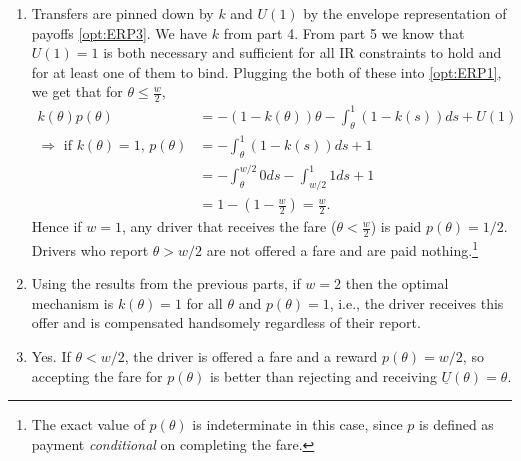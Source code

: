 \documentclass[a4paper]{article}
\begin{document}
\begin{enumerate}
		\item %
		Transfers are pinned down by $k$ and $U(1)$ by the envelope representation of payoffs \eqref{opt:ERP3}. We have $k$ from part 4. From part 5 we know that $U(1)=1$ is both necessary and sufficient for all IR constraints to hold and for at least one of them to bind. Plugging the both of these into \eqref{opt:ERP1}, we get that for $\theta \leq \frac{w}{2}$,
		\begin{align*}
			k(\theta)p(\theta) &= -(1-k(\theta)) \theta - \int_{\theta}^{1} (1-k(s)) ds + U(1)
			\\
			\Rightarrow \text{ if $k(\theta)=1$, } p(\theta) &= - \int_{\theta}^{1} (1-k(s)) ds + 1
			\\
			&= - \int_{\theta}^{w/2} 0 ds - \int_{w/2}^1 1 ds + 1
			\\
			&= 1 - \left(1-\frac{w}{2}\right) = \frac{w}{2}.
		\end{align*}
		Hence if $w=1$, any driver that receives the fare ($\theta < \frac{w}{2}$) is paid $p(\theta) = 1/2$. Drivers who report $\theta > w/2$ are not offered a fare and are paid nothing.\footnote{The exact value of $p(\theta)$ is indeterminate in this case, since $p$ is defined as payment \emph{conditional} on completing the fare.}
		
		
		\item Using the results from the previous parts, if $w=2$ then the optimal mechanism is $k(\theta) = 1$ for all $\theta$ and $p(\theta)=1$, i.e., the driver receives this offer and is compensated handsomely regardless of their report.
		
		\item Yes. If $\theta < w/2$, the driver is offered a fare and a reward $p(\theta) = w/2$, so accepting the fare for $p(\theta)$ is better than rejecting and receiving $\underline{U}(\theta)=\theta$.
		
	\end{enumerate}
\fi
\end{document}
